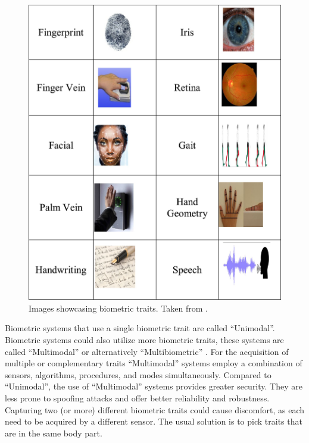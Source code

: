 \begin{figure}[h]
	\centering
	\includegraphics[width=0.56\linewidth]{obrazky-figures/BiometricTraits.pdf}
	\caption{Images showcasing biometric traits. Taken from \cite{biometricTraitsSpec}.}
	\label{BiometricTraitsImages}
\end{figure}

Biometric systems that use a single biometric trait are called ``Unimodal''. Biometric systems could also utilize more biometric traits, these systems are called ``Multimodal'' or alternatively ``Multibiometric'' \cite{biometricTraitsSpec}. For the acquisition of multiple or complementary traits ``Multimodal'' systems employ a combination of sensors, algorithms, procedures, and modes simultaneously. Compared to ``Unimodal'', the use of ``Multimodal'' systems provides greater security. They are less prone to spoofing attacks and offer better reliability and robustness. Capturing two (or more) different biometric traits could cause discomfort, as each need to be acquired by a different sensor. The usual solution is to pick traits that are in the same body part.  


